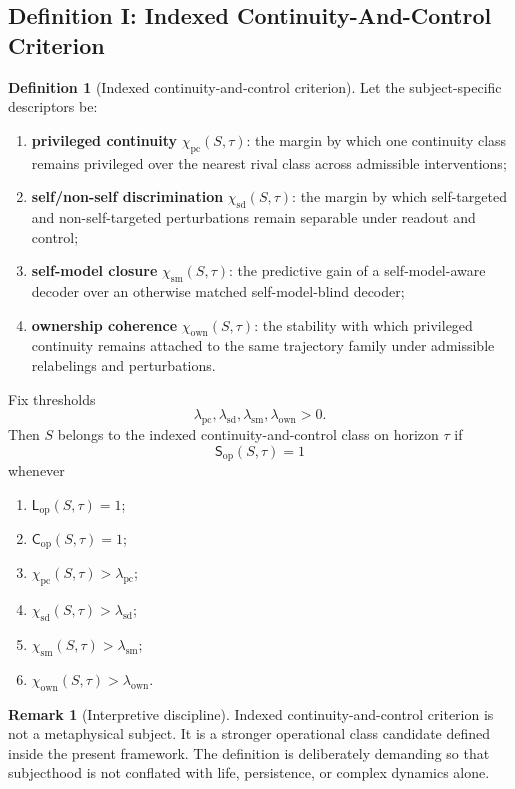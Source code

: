 \documentclass[11pt,a4paper]{article}
\theoremstyle{definition}
\newtheorem{definition}[proposition]{Definition}
\newtheorem{remark}[proposition]{Remark}
\newcommand{\Cop}{\mathsf{C}_{\mathrm{op}}}
\newcommand{\Lop}{\mathsf{L}_{\mathrm{op}}}
\newcommand{\Subop}{\mathsf{S}_{\mathrm{op}}}
\newcommand{\Priv}{\chi_{\mathrm{pc}}}
\newcommand{\SelfDisc}{\chi_{\mathrm{sd}}}
\newcommand{\SelfModel}{\chi_{\mathrm{sm}}}
\newcommand{\Own}{\chi_{\mathrm{own}}}
\begin{document}
\subsection{Definition I: Indexed Continuity-And-Control Criterion}
\begin{definition}[Indexed continuity-and-control criterion]\label{def:operational-subjecthood}
Let the subject-specific descriptors be:
\begin{enumerate}[leftmargin=1.5em]
\item \textbf{privileged continuity} $\Priv(S,\tau)$: the margin by which one continuity class remains privileged over the nearest rival class across admissible interventions;
\item \textbf{self/non-self discrimination} $\SelfDisc(S,\tau)$: the margin by which self-targeted and non-self-targeted perturbations remain separable under readout and control;
\item \textbf{self-model closure} $\SelfModel(S,\tau)$: the predictive gain of a self-model-aware decoder over an otherwise matched self-model-blind decoder;
\item \textbf{ownership coherence} $\Own(S,\tau)$: the stability with which privileged continuity remains attached to the same trajectory family under admissible relabelings and perturbations.
\end{enumerate}
Fix thresholds
\[
\lambda_{\mathrm{pc}},\lambda_{\mathrm{sd}},\lambda_{\mathrm{sm}},\lambda_{\mathrm{own}}>0.
\]
Then $S$ belongs to the indexed continuity-and-control class on horizon $\tau$ if
\[
\Subop(S,\tau)=1
\]
whenever
\begin{enumerate}[leftmargin=1.5em]
\item $\Lop(S,\tau)=1$;
\item $\Cop(S,\tau)=1$;
\item $\Priv(S,\tau)>\lambda_{\mathrm{pc}}$;
\item $\SelfDisc(S,\tau)>\lambda_{\mathrm{sd}}$;
\item $\SelfModel(S,\tau)>\lambda_{\mathrm{sm}}$;
\item $\Own(S,\tau)>\lambda_{\mathrm{own}}$.
\end{enumerate}
\end{definition}

\begin{remark}[Interpretive discipline]
Indexed continuity-and-control criterion is not a metaphysical subject. It is a stronger operational class candidate defined inside the present framework. The definition is deliberately demanding so that subjecthood is not conflated with life, persistence, or complex dynamics alone.
\end{remark}
\end{document}

